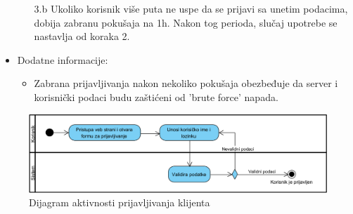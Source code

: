 \begin{itemize}
\begin{itemize}
            \item[3.b] Ukoliko korisnik više puta ne uspe da se prijavi sa unetim podacima, dobija zabranu pokušaja na 1h. Nakon tog perioda, slučaj upotrebe se nastavlja od koraka 2.
        \end{itemize}
    \item Dodatne informacije:
        \begin{itemize}
            \item Zabrana prijavljivanja nakon nekoliko pokušaja obezbeđuje da server i korisnički podaci budu zaštićeni od 'brute force' napada.
        \end{itemize}
\end{itemize}

\begin{figure}[H]
\begin{center}
\includegraphics[width=\textwidth]{Pictures/activity_user_login.png}
\end{center}
    \caption{Dijagram aktivnosti prijavljivanja klijenta}
\label{fig:ActivityUserLogin}
\end{figure}
